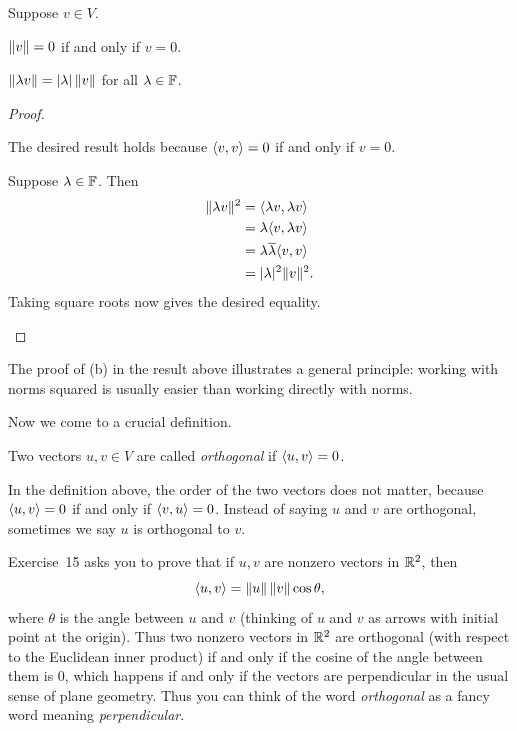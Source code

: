 \begin{result}\label{ax:6.9}
Suppose $v\in V$.
\begin{parts}
\item $\lVert v \rVert=0$ if and only if $v=0$.
\item $\lVert \lambda v \rVert=\lvert \lambda \rvert\,\lVert v \rVert$ for all $\lambda\in\mathbb{F}$.
\end{parts}
\end{result}

\begin{proof}\leavevmode
\begin{parts}
\item The desired result holds because $\langle v, v \rangle=0$ if and only if $v=0$.
\item Suppose $\lambda\in\mathbb{F}$. Then
  \begin{align*}
  \lVert \lambda v \rVert^2 &= \langle \lambda v, \lambda v \rangle\\
    &= \lambda\langle v, \lambda v \rangle\\
    &= \lambda\overline{\lambda}\langle v, v \rangle\\
    &= \lvert \lambda \rvert^2\lVert v \rVert^2.
  \end{align*}
  Taking square roots now gives the desired equality. \qedhere
\end{parts}
\end{proof}

The proof of (b) in the result above illustrates a general principle: working
with norms squared is usually easier than working directly with norms.

Now we come to a crucial definition.

\begin{definition}[Orthogonal]\label{ax:6.10}
Two vectors $u,v\in V$ are called \emph{orthogonal} if $\langle u, v \rangle=0$.
\end{definition}

%
In the definition above, the order of the two vectors does not matter, because
$\langle u, v \rangle=0$ if and only if $\langle v, u \rangle=0$. Instead of saying $u$ and $v$ are
orthogonal, sometimes we say $u$ is orthogonal to $v$.

Exercise~15 asks you to prove that if $u,v$ are nonzero vectors in $\mathbb{R}^2$, then
\[ \langle u, v \rangle = \lVert u \rVert\,\lVert v \rVert\cos\theta, \]
where $\theta$ is the angle between $u$ and $v$ (thinking of $u$ and $v$ as
arrows with initial point at the origin). Thus two nonzero vectors in $\mathbb{R}^2$ are
orthogonal (with respect to the Euclidean inner product) if and only if the
cosine of the angle between them is $0$, which happens if and only if the
vectors are perpendicular in the usual sense of plane geometry. Thus you can
think of the word \emph{orthogonal} as a fancy word meaning
\emph{perpendicular}.

